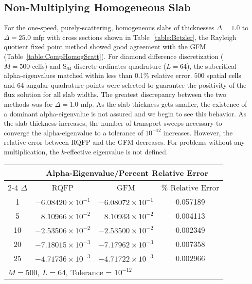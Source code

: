 \subsection{Non-Multiplying Homogeneous Slab}
For the one-speed, purely-scattering, homogeneous slabs of thicknesses $\Delta = 1.0$ to $\Delta = 25.0$ mfp with cross sections shown in Table~\ref{table:Betzler}, the Rayleigh quotient fixed point method showed good agreement with the GFM (Table~\ref{table:CompHomogScatt}). For diamond difference discretization ($M = 500$ cells) and S$_{64}$ discrete ordinates quadrature ($L = 64$), the subcritical alpha-eigenvalues matched within less than 0.1\% relative error. $500$ spatial cells and $64$ angular quadrature points were selected to guarantee the positivity of the flux solution for all slab widths. The greatest discrepancy between the two methods was for $\Delta = 1.0$ mfp. As the slab thickness gets smaller, the existence of a dominant alpha-eigenvalue is not assured and we begin to see this behavior. As the slab thickness increases, the number of transport sweeps necessary to converge the alpha-eigenvalue to a tolerance of $10^{-12}$ increases. However, the relative error between RQFP and the GFM decreases. For problems without any multiplication, the $k$-effective eigenvalue is not defined.

\begin{table*}[!htbp]
\centering{}
\caption{Comparison of RQFP- and GFM-calculated alpha-eigenvalues for a homogeneous scattering slab}
\label{table:CompHomogScatt}
\begin{tabular}{@{}cccc@{}}\toprule
& \multicolumn{3}{c}{Alpha-Eigenvalue/Percent Relative Error} \\
\cmidrule{2-4} $\Delta$ & RQFP & GFM & \% Relative Error \\
\midrule
1 & $-6.08420 \times 10^{-1}$ & $-6.08072 \times 10^{-1}$ & 0.057189 \\ 
5 & $-8.10966 \times 10^{-2}$ & $-8.10933 \times 10^{-2}$ & 0.004113 \\ 
10 & $-2.53506 \times 10^{-2}$ & $-2.53500 \times 10^{-2}$ & 0.002349 \\ 
20 & $-7.18015 \times 10^{-3}$ & $-7.17962 \times 10^{-3}$ & 0.007358 \\ 
25 & $-4.71736 \times 10^{-3}$ & $-4.71722 \times 10^{-3}$ & 0.002966 \\ 
\bottomrule
\multicolumn{4}{l}{$M = 500$, $L = 64$, Tolerance = $10^{-12}$} \\
\end{tabular}
\end{table*}

